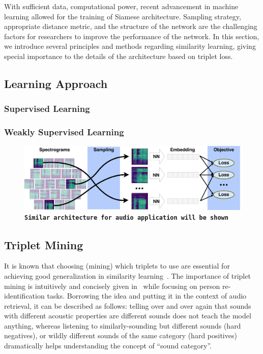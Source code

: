With sufficient data, computational power, recent advancement in machine learning allowed for the training of Siamese architecture. Sampling strategy, appropriate distance metric, and the structure of the network are the challenging factors for researchers to improve the performance of the network.  In this section, we introduce several principles and methods regarding similarity learning, giving special importance to the details of the architecture based on triplet loss.

\subsection{Learning Approach}
\subsubsection*{Supervised Learning}
\subsubsection*{Weakly Supervised Learning}

\begin{figure}[htb]
	\centering
	\includegraphics[width=13cm]{Figures/learning_scheme.png}
	\caption{\texttt{\textbf{Similar architecture for audio application will be shown}}}
	\label{deep-model}
\end{figure}

\subsection{Triplet Mining}
It is known that choosing (mining) which triplets to use are essential for achieving good generalization in similarity learning~\cite{schroff2015}. The importance of triplet mining is intuitively and concisely given in~\cite{hermans2017} while focusing on person re-identification tasks. Borrowing the idea and putting it in the context of audio retrieval, it can be described as follows: telling over and over again that sounds with different acoustic properties are different sounds does not teach the model anything, whereas listening to similarly-sounding but different sounds (hard negatives), or wildly different sounds of the same category (hard positives) dramatically helps understanding the concept of “sound category”. 

